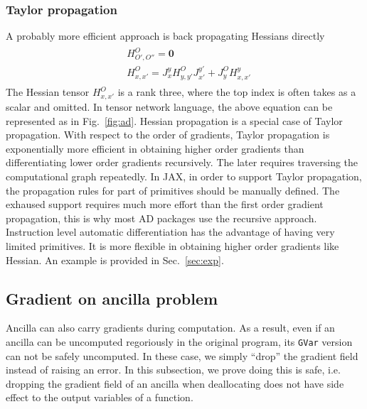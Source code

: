 \documentclass[aps,twocolumn,longbibliography,english,superscriptaddress,prr]{revtex4-1}
\newcommand{\<}{\langle}
\renewcommand{\>}{\rangle}
\newcommand{\Fig}[1]{Fig.~\ref{#1}}
\newcommand{\Sec}[1]{Sec.~\ref{#1}}
\theoremstyle{definition}\newtheorem{definition}{\textit{Definition}}
\begin{document}
\subsubsection{Taylor propagation}
A probably more efficient approach is back propagating Hessians directly~\cite{Martens2012}
\begin{align}
    \begin{split}
        &H^{O}_{O',O''} = \mathbf{0}\\
        &H^{O}_{x,x'} = J^{y}_{x} H^{O}_{y, y'} J^{y'}_{x'} + J^{O}_{y} H^{y}_{x, x'}
    \end{split}
\end{align}
The Hessian tensor $H^O_{x,x'}$ is a rank three, where the top index is often takes as a scalar and omitted.
In tensor network language, the above equation can be represented as in \Fig{fig:ad}.
Hessian propagation is a special case of Taylor propagation.
With respect to the order of gradients, Taylor propagation is exponentially more efficient in obtaining higher order gradients than differentiating lower order gradients recursively. The later requires traversing the computational graph repeatedly.
In JAX, in order to support Taylor propagation, the propagation rules for part of primitives should be manually defined.
The exhaused support requires much more effort than the first order gradient propagation, this is why most AD packages use the recursive approach.
Instruction level automatic differentiation has the advantage of having very limited primitives. It is more flexible in obtaining higher order gradients like Hessian.
An example is provided in \Sec{sec:exp}.

\subsection{Gradient on ancilla problem}
Ancilla can also carry gradients during computation. As a result, even if an ancilla can be uncomputed regoriously in the original program, its \texttt{GVar} version can not be safely uncomputed.
In these case, we simply ``drop'' the gradient field instead of raising an error. In this subsection, we prove doing this is safe, i.e. dropping the gradient field of an ancilla when deallocating does not have side effect to the output variables of a function.
\end{document}
